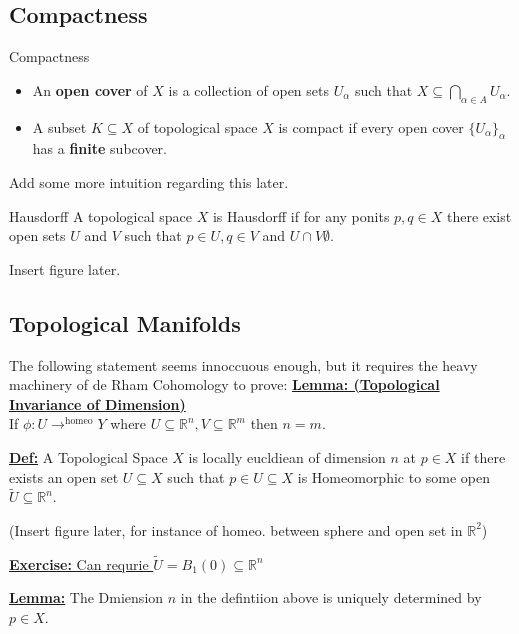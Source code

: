 \documentclass{article}
\begin{document}
\subsection{Compactness}

\begin{mathdefinitionbox}{Compactness}
  \begin{itemize}
    \item An \textbf{open cover} of $X$ is a collection of open sets $U_{\alpha}$ such that $X \subseteq \bigcap_{\alpha \in A} U_{\alpha}$.
    \item A subset $K \subseteq X$ of topological space $X$ is compact if every open cover $\{ U_{\alpha}\}_{\alpha}$ has a \textbf{finite} subcover.
  \end{itemize}
\end{mathdefinitionbox}

Add some more intuition regarding this later.

\begin{mathdefinitionbox}{Hausdorff}
  A topological space $X$ is Hausdorff if for any ponits $p, q \in X$ there exist open sets $U$ and $V$ such that $p \in U, q \in V$ and $U \cap V  \emptyset$.
\end{mathdefinitionbox}

Insert figure later.

\subsection{Topological Manifolds}

The following statement seems innoccuous enough, but it requires the heavy machinery of de Rham Cohomology to prove:
\vskip 0.25cm
\underline{\textbf{Lemma: (Topological Invariance of Dimension)}} \\
If $\phi : U \rightarrow^{\text{homeo}} Y$ where $U \subseteq \mathbb{R}^n, V \subseteq \mathbb{R}^m$ then $n = m$.

\vskip 0.5cm
\underline{\textbf{Def:}}
A Topological Space $X$ is locally eucldiean of dimension $n$ at $p \in X$ if there exists an open set $U \subseteq X$ such that $p \in U \subseteq X$ is Homeomorphic to some open $\tilde{U} \subseteq \mathbb{R}^n$.

(Insert figure later, for instance of homeo. between sphere and open set in $\mathbb{R}^2$)

\vskip 0.5cm
\underline{\textbf{Exercise:} Can requrie $\tilde{U} = B_{1}(0) \subseteq \mathbb{R}^n$}

\vskip 0.5cm
\underline{\textbf{Lemma:}} The Dmiension $n$ in the defintiion above is uniquely determined by $p \in X$.
\end{document}
